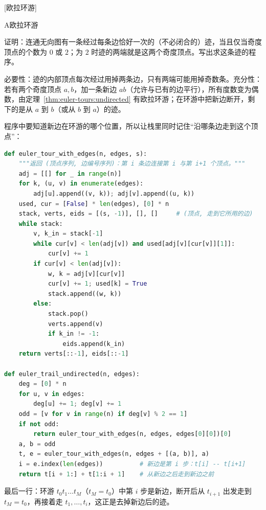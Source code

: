 [欧拉环游]


\begin{exercises}{A}{欧拉环游}
\item\label{ex:euler-tours:A1} 证明：连通无向图有一条经过每条边恰好一次的（不必闭合的）迹，当且仅当奇度顶点的个数为 $0$ 或 $2$；为 $2$ 时迹的两端就是这两个奇度顶点。写出求这条迹的程序。
\begin{solution}
必要性：迹的内部顶点每次经过用掉两条边，只有两端可能用掉奇数条。充分性：若有两个奇度顶点 $a,b$，加一条新边 $ab$（允许与已有的边平行），所有度数变为偶数，由定理~\ref{thm:euler-tours:undirected} 有欧拉环游；在环游中把新边断开，剩下的是从 $a$ 到 $b$（或从 $b$ 到 $a$）的迹。

程序中要知道新边在环游的哪个位置，所以让栈里同时记住“沿哪条边走到这个顶点”：
\begin{lstlisting}[language=Python]
def euler_tour_with_edges(n, edges, s):
    """返回 (顶点序列, 边编号序列)：第 i 条边连接第 i 与第 i+1 个顶点。"""
    adj = [[] for _ in range(n)]
    for k, (u, v) in enumerate(edges):
        adj[u].append((v, k)); adj[v].append((u, k))
    used, cur = [False] * len(edges), [0] * n
    stack, verts, eids = [(s, -1)], [], []     # (顶点, 走到它所用的边)
    while stack:
        v, k_in = stack[-1]
        while cur[v] < len(adj[v]) and used[adj[v][cur[v]][1]]:
            cur[v] += 1
        if cur[v] < len(adj[v]):
            w, k = adj[v][cur[v]]
            cur[v] += 1; used[k] = True
            stack.append((w, k))
        else:
            stack.pop()
            verts.append(v)
            if k_in != -1:
                eids.append(k_in)
    return verts[::-1], eids[::-1]

def euler_trail_undirected(n, edges):
    deg = [0] * n
    for u, v in edges:
        deg[u] += 1; deg[v] += 1
    odd = [v for v in range(n) if deg[v] % 2 == 1]
    if not odd:
        return euler_tour_with_edges(n, edges, edges[0][0])[0]
    a, b = odd
    t, e = euler_tour_with_edges(n, edges + [(a, b)], a)
    i = e.index(len(edges))          # 新边是第 i 步：t[i] -- t[i+1]
    return t[i + 1:] + t[1:i + 1]    # 从新边之后走到新边之前
\end{lstlisting}
最后一行：环游 $t_0t_1\dots t_M$（$t_M=t_0$）中第 $i$ 步是新边，断开后从 $t_{i+1}$ 出发走到 $t_M=t_0$，再接着走 $t_1,\dots,t_i$，这正是去掉新边后的迹。
\end{solution}


\end{exercises}
